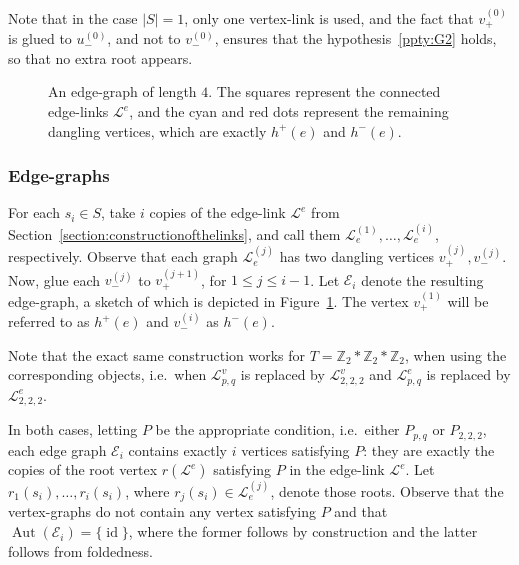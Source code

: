\documentclass[10pt,a4paper]{amsart}
\makeatletter
\newcommand{\ie}{i.e.\ }
\theoremstyle{definition}
\let\sourceMathTruncateMacro\pgfmathtruncatemacro
\def\sourceConsumeMathSemicolon{\@ifnextchar;{\@gobble}{}}
\def\pgfmathtruncatemacro#1#2{\sourceMathTruncateMacro{#1}{#2}\sourceConsumeMathSemicolon}
\newcommand{\ZZ}{\mathbb{Z}}
\newcommand{\cL}{\mathcal{L}}
\newcommand{\cE}{\mathcal{E}}
\DeclareMathOperator{\aut}{Aut}
\DeclareMathOperator{\id}{id}
\makeatother
\begin{document}
Note that in the case $|S|=1$, only one vertex-link is used, and the fact that $v^{(0)}_{+}$ is glued to $u^{(0)}_{-}$, and not to $v^{(0)}_{-}$, ensures that the hypothesis~\ref{ppty:G2} holds, so that no extra root appears.

\begin{figure}[htb]
\centering
\caption{An edge-graph of length $4$. The squares represent the connected edge-links $\cL^e$, and the cyan and red dots represent the remaining dangling vertices, which are exactly $h^{+}(e)$ and $h^{-}(e)$.}\label{fig:edge-graph}
\end{figure}


\subsubsection*{Edge-graphs}
For each $s_i\in S$, take $i$ copies of the edge-link $\cL^{e}$ from Section~\ref{section:constructionofthelinks}, and call them $\cL_e ^{(1)}, \dots ,\cL_e ^{(i)}$, respectively. Observe that each graph $\cL_e ^{(j)}$ has two dangling vertices $v^{(j)}_+,v^{(j)}_-$. Now, glue each 
$v^{(j)}_{-}$ to $v^{(j+1)}_{+}$, for $1 \leq j \leq i-1$. Let $\cE_i$ denote the resulting edge-graph, a sketch of which is depicted in Figure~\ref{fig:edge-graph}. The vertex $v^{(1)}_+$ will be referred to as $h^{+}(e)$ and $v^{(i)}_-$ as $h^{-}(e)$.

Note that the exact same construction works for $T=\ZZ_2*\ZZ_2*\ZZ_2$, when using the corresponding objects, \ie when $\cL^v_{p,q}$ is replaced by $\cL^v_{2,2,2}$ and $\cL^e_{p,q}$ is replaced by $\cL^e_{2,2,2}$. 

In both cases, letting $P$ be the appropriate condition, \ie either $P_{p,q}$ or $P_{2,2,2}$, each edge graph $\cE_i$ contains exactly $i$ vertices satisfying $P$: they are exactly the copies of the root vertex $r(\cL^e)$ satisfying $P$ in the edge-link $\cL^e$. Let $r_1(s_i), \dots ,r_i(s_i)$, where $r_{j}(s_i) \in \cL_{e}^{(j)}$, denote those roots. Observe that the vertex-graphs do not contain any vertex satisfying $P$ and that $\aut(\cE_i) = \{\id \}$, where the former follows by construction and the latter follows from foldedness. 
\end{document}
